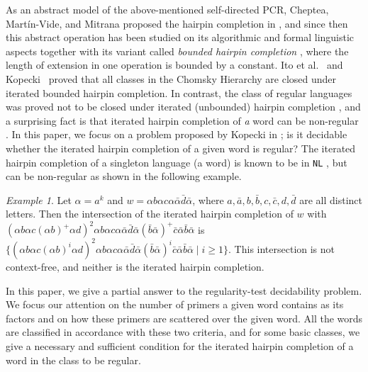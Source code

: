 \documentclass{article}
\theoremstyle{plain}
\theoremstyle{remark}
\newtheorem{example}{Example}
\begin{document}
As an abstract model of the above-mentioned self-directed PCR, Cheptea, Mart\'{i}n-Vide, and Mitrana proposed the hairpin completion in \cite{ChMaMi06}, and since then this abstract operation has been studied on its algorithmic and formal linguistic aspects \cite{DiekertKopecki11, MaViMi09, MaMiYo09, MaMiYo10} together with its variant called {\it bounded hairpin completion} \cite{ItLeMaMi11, Kopecki10}, where the length of extension in one operation is bounded by a constant. 
Ito et al.~\cite{ItLeMaMi11} and Kopecki~\cite{Kopecki10} proved that all classes in the Chomsky Hierarchy are closed under iterated bounded hairpin completion. 
In contrast, the class of regular languages was proved not to be closed under iterated (unbounded) hairpin completion \cite{ChMaMi06}, and a surprising fact is that iterated hairpin completion of {\it a} word can be non-regular \cite{Kopecki10}. 
In this paper, we focus on a problem proposed by Kopecki in \cite{Kopecki10}; is it decidable whether the iterated hairpin completion of a given word is regular? 
The iterated hairpin completion of a singleton language (a word) is known to be in {\tt NL} \cite{ChMaMi06}, but can be non-regular as shown in the following example. 

\begin{example}\label{ex:nonx_cs}
	Let $\alpha = a^k$ and $w = \alpha b \alpha c \alpha \bar{\alpha} \bar{d} \bar{\alpha}$, where $a, \bar{a}, b, \bar{b}, c, \bar{c}, d, \bar{d}$ are all distinct letters. 
	Then the intersection of the iterated hairpin completion of $w$ with $(\alpha b \alpha c (\alpha b)^+ \alpha d)^2 \alpha b \alpha c \alpha \bar{\alpha} \bar{d} \bar{\alpha} (\bar{b} \bar{\alpha})^+ \bar{c} \bar{\alpha} \bar{b} \bar{\alpha}$ is $\{(\alpha b \alpha c (\alpha b)^i \alpha d)^2 \alpha b \alpha c \alpha \bar{\alpha} \bar{d} \bar{\alpha} (\bar{b} \bar{\alpha})^i \bar{c} \bar{\alpha} \bar{b} \bar{\alpha} \mid i \ge 1 \}$. 
	This intersection is not context-free, and neither is the iterated hairpin completion. 
\end{example}

In this paper, we give a partial answer to the regularity-test decidability problem. 
We focus our attention on the number of primers a given word contains as its factors and on how these primers are scattered over the given word. 
All the words are classified in accordance with these two criteria, and for some basic classes, we give a necessary and sufficient condition for the iterated hairpin completion of a word in the class to be regular. 
\end{document}
